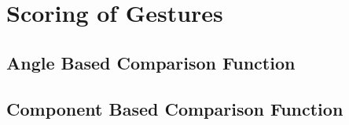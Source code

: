 \chapter{Scoring of Gestures}

\label{Chapter5_scoring} 

\begin{comment}
-------------------------------------------------
5. Scoring of Gestures
	a. Angle Based Comparison Function
	b. Component Based Comparison Function
-------------------------------------------------
\end{comment}



\section{Angle Based Comparison Function}
	


\section{Component Based Comparison Function}
